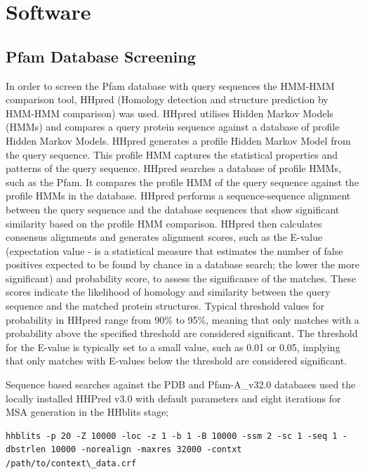 \section{Software}

\subsection{Pfam Database Screening}
In order to screen the Pfam database with query sequences the HMM-HMM comparison tool, HHpred \cite{El-Gebali2019} (Homology detection and structure prediction by HMM-HMM comparison) was used. HHpred utilises Hidden Markov Models (HMMs) and compares a query protein sequence against a database of profile Hidden Markov Models. HHpred generates a profile Hidden Markov Model from the query sequence. This profile HMM captures the statistical properties and patterns of the query sequence.  HHpred searches a database of profile HMMs, such as the Pfam.  It compares the profile HMM of the query sequence against the profile HMMs in the database.  HHpred performs a sequence-sequence alignment between the query sequence and the database sequences that show significant similarity based on the profile HMM comparison. HHpred then calculates consensus alignments and generates alignment scores, such as the E-value (expectation value - is a statistical measure that estimates the number of false positives expected to be found by chance in a database search; the lower the more significant) and probability score, to assess the significance of the matches. These scores indicate the likelihood of homology and similarity between the query sequence and the matched protein structures. Typical threshold values for probability in HHpred range from 90\% to 95\%, meaning that only matches with a probability above the specified threshold are considered significant.
The threshold for the E-value is typically set to a small value, such as 0.01 or 0.05, implying that only matches with E-values below the threshold are considered significant.

Sequence based searches against the PDB and Pfam-A\_v32.0  databases used the locally installed HHPred v3.0 \cite{Zimmermann2018} with default parameters and eight iterations for MSA generation in the HHblits \cite{Remmert2012} stage;

\begin{lstlisting}[style=linux-terminal]
hhblits -p 20 -Z 10000 -loc -z 1 -b 1 -B 10000 -ssm 2 -sc 1 -seq 1 -dbstrlen 10000 -norealign -maxres 32000 -contxt /path/to/context\_data.crf
\end{lstlisting}

